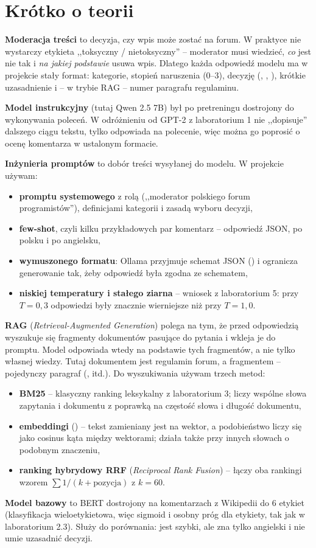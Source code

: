 \section{Krótko o teorii}

\textbf{Moderacja treści} to decyzja, czy wpis może zostać na forum. W praktyce nie wystarczy etykieta
,,toksyczny / nietoksyczny'' -- moderator musi wiedzieć, \emph{co} jest nie tak i \emph{na jakiej podstawie} usuwa
wpis. Dlatego każda odpowiedź modelu ma w projekcie stały format: kategorie, stopień naruszenia (0--3), decyzję
(, , ), krótkie uzasadnienie i -- w trybie RAG -- numer paragrafu regulaminu.

\textbf{Model instrukcyjny} (tutaj Qwen 2.5 7B) był po pretreningu dostrojony do wykonywania poleceń. W odróżnieniu od
GPT-2 z laboratorium 1 nie ,,dopisuje'' dalszego ciągu tekstu, tylko odpowiada na polecenie, więc można go poprosić
o ocenę komentarza w ustalonym formacie.

\textbf{Inżynieria promptów} to dobór treści wysyłanej do modelu. W projekcie używam:
\begin{itemize}
  \item \textbf{promptu systemowego} z rolą (,,moderator polskiego forum programistów''), definicjami kategorii
        i zasadą wyboru decyzji,
  \item \textbf{few-shot}, czyli kilku przykładowych par komentarz -- odpowiedź JSON, po polsku i po angielsku,
  \item \textbf{wymuszonego formatu}: Ollama przyjmuje schemat JSON () i ogranicza generowanie tak,
        żeby odpowiedź była zgodna ze schematem,
  \item \textbf{niskiej temperatury i stałego ziarna} -- wniosek z laboratorium 5: przy $T=0{,}3$ odpowiedzi były
        znacznie wierniejsze niż przy $T=1{,}0$.
\end{itemize}

\textbf{RAG} (\emph{Retrieval-Augmented Generation}) polega na tym, że przed odpowiedzią wyszukuje się fragmenty
dokumentów pasujące do pytania i wkleja je do promptu. Model odpowiada wtedy na podstawie tych fragmentów, a nie tylko
własnej wiedzy. Tutaj dokumentem jest regulamin forum, a fragmentem -- pojedynczy paragraf (, 
itd.). Do wyszukiwania używam trzech metod:
\begin{itemize}
  \item \textbf{BM25} -- klasyczny ranking leksykalny z laboratorium 3; liczy wspólne słowa zapytania i dokumentu
        z poprawką na częstość słowa i długość dokumentu,
  \item \textbf{embeddingi} () -- tekst zamieniany jest na wektor, a podobieństwo liczy się
        jako cosinus kąta między wektorami; działa także przy innych słowach o podobnym znaczeniu,
  \item \textbf{ranking hybrydowy RRF} (\emph{Reciprocal Rank Fusion}) -- łączy oba rankingi wzorem
        $\sum 1/(k + \text{pozycja})$ z $k = 60$.
\end{itemize}

\textbf{Model bazowy}  to BERT dostrojony na komentarzach z Wikipedii do 6 etykiet
(klasyfikacja wieloetykietowa, więc sigmoid i osobny próg dla etykiety, tak jak w laboratorium 2.3). Służy do
porównania: jest szybki, ale zna tylko angielski i nie umie uzasadnić decyzji.
